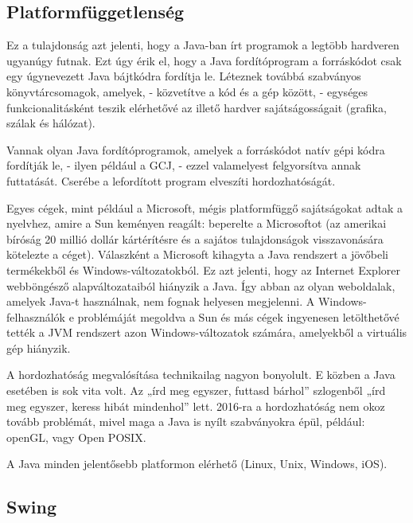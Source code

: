 \documentclass[a4paper,12pt]{report}
\begin{document}
\subsection{Platformfüggetlenség}
\label{platformfugg}

Ez a tulajdonság azt jelenti, hogy a Java-ban írt programok a legtöbb hardveren ugyanúgy futnak. Ezt úgy érik el, hogy a Java fordítóprogram a forráskódot csak egy úgynevezett Java bájtkódra fordítja le. Léteznek továbbá szabványos könyvtárcsomagok, amelyek, - közvetítve a kód és a gép között, - egységes funkcionalitásként teszik elérhetővé az illető hardver sajátságosságait (grafika, szálak és hálózat).

\vspace{2mm}
Vannak olyan Java fordítóprogramok, amelyek a forráskódot natív gépi kódra fordítják le, - ilyen például a GCJ, - ezzel valamelyest felgyorsítva annak futtatását. Cserébe a lefordított program elveszíti hordozhatóságát.

\vspace{2mm}
Egyes cégek, mint például a Microsoft, mégis platformfüggő sajátságokat adtak a nyelvhez, amire a Sun keményen reagált: beperelte a Microsoftot (az amerikai bíróság 20 millió dollár kártérítésre és a sajátos tulajdonságok visszavonására kötelezte a céget). Válaszként a Microsoft kihagyta a Java rendszert a jövőbeli termékekből és Windows-változatokból. Ez azt jelenti, hogy az Internet Explorer webböngésző alapváltozataiból hiányzik a Java. Így abban az olyan weboldalak, amelyek Java-t használnak, nem fognak helyesen megjelenni. A Windows-felhasználók e problémáját megoldva a Sun és más cégek ingyenesen letölthetővé tették a JVM rendszert azon Windows-változatok számára, amelyekből a virtuális gép hiányzik.

\vspace{2mm}
A hordozhatóság megvalósítása technikailag nagyon bonyolult. E közben a Java esetében is sok vita volt. Az „írd meg egyszer, futtasd bárhol” szlogenből „írd meg egyszer, keress hibát mindenhol” lett. 2016-ra a hordozhatóság nem okoz tovább problémát, mivel maga a Java is nyílt szabványokra épül, például: openGL, vagy Open POSIX.

\vspace{2mm}
A Java minden jelentősebb platformon elérhető (Linux, Unix, Windows, iOS).

\subsection{Swing}
\label{swing}
\end{document}
